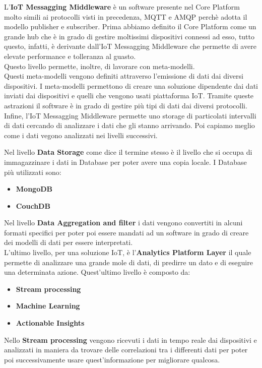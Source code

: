 \documentclass[10pt,a4paper,oneside]{scrbook}
\begin{document}
L'\textbf{IoT Messagging Middleware} è un software presente nel Core Platform molto simili ai protocolli visti in precedenza, MQTT e AMQP perchè adotta il modello publisher e subscriber.
Prima abbiamo definito il Core Platform come un grande hub che è in grado di gestire moltissimi dispositivi connessi ad esso, tutto questo, infatti, è derivante dall'IoT Messagging Middleware che permette di avere elevate performance e tolleranza al guasto.\\
Questo livello permette, inoltre, di lavorare con meta-modelli.\\
Questi meta-modelli vengono definiti attraverso l'emissione di dati dai diversi dispositivi. I meta-modelli permettono di creare una soluzione dipendente dai dati inviati dai dispositivi e quelli che vengono usati piattaforma IoT. Tramite queste astrazioni il software è in grado di gestire più tipi di dati dai diversi protocolli. Infine, l'IoT Messagging Middleware permette uno storage di particolati intervalli di dati cercando di analizzare i dati che gli stanno arrivando. Poi capiamo meglio come i dati vegono analizzati nei livelli successivi.

Nel livello \textbf{Data Storage} come dice il termine stesso è il livello che si occupa di immagazzinare i dati in Database per poter avere una copia locale.
I Database più utilizzati sono:
\begin{itemize}
    \item \textbf{MongoDB}
    \item \textbf{CouchDB}
\end{itemize}
Nel livello \textbf{Data Aggregation and filter} i dati vengono convertiti in alcuni formati specifici per poter poi essere mandati ad un software in grado di creare dei modelli di dati per essere interpretati.\pagebreak
\\
L'ultimo livello, per una soluzione IoT, è l'\textbf{Analytics Platform Layer} il quale permette di analizzare una grande mole di dati, di predirre un dato e di eseguire una determinata azione.
Quest'ultimo livello è composto da:
\begin{itemize}
    \item \textbf{Stream processing}
    \item \textbf{Machine Learning}
    \item \textbf{Actionable Insights}
\end{itemize}
Nello \textbf{Stream processing} vengono ricevuti i dati in tempo reale dai dispositivi e analizzati in maniera da trovare delle correlazioni tra i differenti dati per poter poi successivamente usare quest'informazione per migliorare qualcosa.
\end{document}
